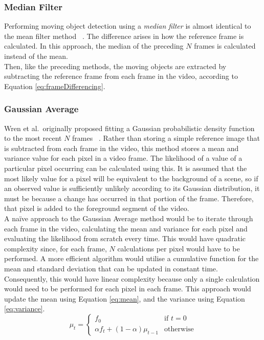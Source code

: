 \setlength{\leftskip}{0cm}
\subsubsection{Median Filter}
\setlength{\leftskip}{0.5cm}
\indent \indent
Performing moving object detection using a \textit{median filter} is almost identical to the mean filter method ~\cite{MeanFilter}. The difference arises in how the reference frame is calculated. In this approach, the median of the preceding $N$ frames is calculated instead of the mean.
\smallskip \\ \indent
Then, like the preceding methods, the moving objects are extracted by subtracting the reference frame from each frame in the video, according to Equation \ref{eq:frameDifferencing}.

\setlength{\leftskip}{0cm}
\subsubsection{Gaussian Average}
\setlength{\leftskip}{0.5cm}
\indent \indent
Wren et al.\ originally proposed fitting a Gaussian probabilistic density function to the most recent $N$ frames ~\cite{Wren}. Rather than storing a simple reference image that is subtracted from each frame in the video, this method stores a mean and variance value for each pixel in a video frame. The likelihood of a value of a particular pixel occurring can be calculated using this. It is assumed that the most likely value for a pixel will be equivalent to the background of a scene, so if an observed value is sufficiently unlikely according to its Gaussian distribution, it must be because a change has occurred in that portion of the frame. Therefore, that pixel is added to the foreground segment of the video.
\smallskip \\ \indent
A na\"ive approach to the Gaussian Average method would be to iterate through each frame in the video, calculating the mean and variance for each pixel and evaluating the likelihood from scratch every time. This would have quadratic complexity since, for each frame, $N$ calculations per pixel would have to be performed. A more efficient algorithm would utilise a cumulative function for the mean and standard deviation that can be updated in constant time. Consequently, this would have linear complexity because only a single calculation would need to be performed for each pixel in each frame. This approach would update the mean using Equation \ref{eq:mean}, and the variance using Equation \ref{eq:variance}.
\begin{equation}
    \label{eq:mean}
    \mu_t =
    \begin{cases}
        f_0 & \text{if $t = 0$} \\
        \alpha f_t + (1 - \alpha) \mu_{t-1} & \text{otherwise}
    \end{cases}
\end{equation}
